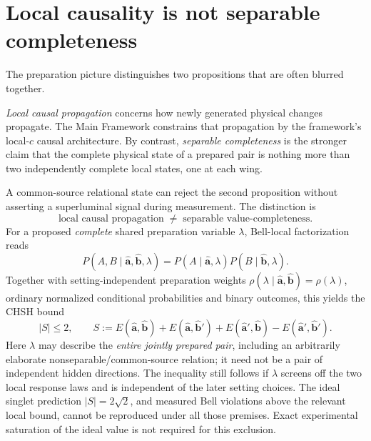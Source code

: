 \documentclass[11pt]{article}
\theoremstyle{remark}
\newcommand{\ahat}{\hat{\bm a}}
\newcommand{\bhat}{\hat{\bm b}}
\begin{document}
\section{Local causality is not separable completeness}
\label{sec:locality}

The preparation picture distinguishes two propositions that are often blurred together.

\emph{Local causal propagation} concerns how newly generated physical changes propagate.  The Main
Framework \cite{CmotionMainFramework2026} constrains that propagation by the
framework's local-\(c\) causal architecture.  By
contrast, \emph{separable completeness} is the stronger claim that the complete physical state of a
prepared pair is nothing more than two independently complete local states, one at each wing.

A common-source relational state can reject the second proposition without asserting a
superluminal signal during measurement.  The distinction is
\begin{equation}
  \boxed{
  \text{local causal propagation}
  \;\neq\;
  \text{separable value-completeness}.}
  \label{eq:locality_distinction}
\end{equation}
For a proposed \emph{complete} shared preparation variable \(\lambda\), Bell-local
factorization reads
\begin{equation}
  P(A,B\mid\ahat,\bhat,\lambda)
  =P(A\mid\ahat,\lambda)P(B\mid\bhat,\lambda).
  \label{eq:bell_factorization}
\end{equation}
Together with setting-independent preparation weights
\(\rho(\lambda\mid\ahat,\bhat)=\rho(\lambda)\), ordinary normalized
conditional probabilities and binary outcomes, this yields the CHSH bound \cite{Bell1964,CHSH1969}
\begin{equation}
  \boxed{|S|\leq2,}
  \qquad
  S:=E(\ahat,\bhat)+E(\ahat,\bhat')
  +E(\ahat',\bhat)-E(\ahat',\bhat').
  \label{eq:bell_complete_bound}
\end{equation}
Here \(\lambda\) may describe the \emph{entire jointly prepared pair},
including an arbitrarily elaborate nonseparable/common-source relation;
it need not be a pair of independent hidden directions.  The inequality
still follows if \(\lambda\) screens off the two local response laws and
is independent of the later setting choices.  The ideal singlet prediction \(|S|=2\sqrt2\), and measured Bell
violations above the relevant local bound, cannot be reproduced under all
those premises.  Exact experimental saturation of the ideal value is not
required for this exclusion.
\end{document}

